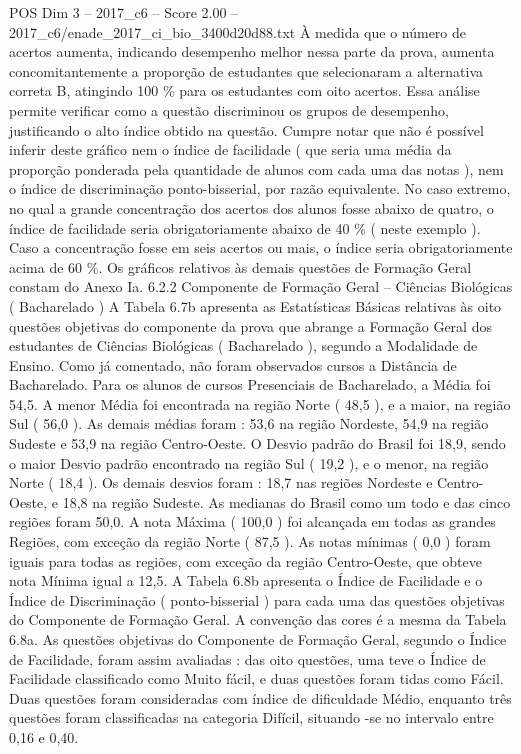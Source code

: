 \begin{textsample}{POS Dim 3 – 2017\_c6 – Score 2.00 – 2017\_c6/enade\_2017\_ci\_bio\_3400d20d88.txt}
À medida que o número de acertos aumenta, indicando desempenho melhor nessa parte da prova, aumenta concomitantemente a proporção de estudantes que selecionaram a alternativa correta B, atingindo 100 \% para os estudantes com oito acertos.
Essa análise permite verificar como a questão discriminou os grupos de desempenho, justificando o alto índice obtido na questão.
Cumpre notar que não é possível inferir deste gráfico nem o índice de facilidade ( que seria uma média da proporção ponderada pela quantidade de alunos com cada uma das notas ), nem o índice de discriminação ponto-bisserial, por razão equivalente.
No caso extremo, no qual a grande concentração dos acertos dos alunos fosse abaixo de quatro, o índice de facilidade seria obrigatoriamente abaixo de 40 \% ( neste exemplo ).
Caso a concentração fosse em seis acertos ou mais, o índice seria obrigatoriamente acima de 60 \%.
Os gráficos relativos às demais questões de Formação Geral constam do Anexo Ia. 6.2.2 Componente de Formação Geral – Ciências Biológicas ( Bacharelado ) A Tabela 6.7b apresenta as Estatísticas Básicas relativas às oito questões objetivas do componente da prova que abrange a Formação Geral dos estudantes de Ciências Biológicas ( Bacharelado ), segundo a Modalidade de Ensino.
Como já comentado, não foram observados cursos a Distância de Bacharelado.
Para os alunos de cursos Presenciais de Bacharelado, a Média foi 54,5.
A menor Média foi encontrada na região Norte ( 48,5 ), e a maior, na região Sul ( 56,0 ).
As demais médias foram : 53,6 na região Nordeste, 54,9 na região Sudeste e 53,9 na região Centro-Oeste.
O Desvio padrão do Brasil foi 18,9, sendo o maior Desvio padrão encontrado na região Sul ( 19,2 ), e o menor, na região Norte ( 18,4 ).
Os demais desvios foram : 18,7 nas regiões Nordeste e Centro-Oeste, e 18,8 na região Sudeste.
As medianas do Brasil como um todo e das cinco regiões foram 50,0.
A nota Máxima ( 100,0 ) foi alcançada em todas as grandes Regiões, com exceção da região Norte ( 87,5 ).
As notas mínimas ( 0,0 ) foram iguais para todas as regiões, com exceção da região Centro-Oeste, que obteve nota Mínima igual a 12,5.
A Tabela 6.8b apresenta o Índice de Facilidade e o Índice de Discriminação ( ponto-bisserial ) para cada uma das questões objetivas do Componente de Formação Geral.
A convenção das cores é a mesma da Tabela 6.8a.
As questões objetivas do Componente de Formação Geral, segundo o Índice de Facilidade, foram assim avaliadas : das oito questões, uma teve o Índice de Facilidade classificado como Muito fácil, e duas questões foram tidas como Fácil.
Duas questões foram consideradas com índice de dificuldade Médio, enquanto três questões foram classificadas na categoria Difícil, situando -se no intervalo entre 0,16 e 0,40.

\end{textsample}

